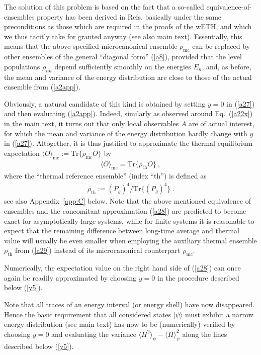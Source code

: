 \documentclass[twocolumn,aps,prb,floatfix,superscriptaddress]{revtex4-2}
\newcommand{\<}{\left\langle}	%
\renewcommand{\>}{\right\rangle}	%
\newcommand{\Pg}{P_{\! g}}
\newcommand{\tr}{\mbox{Tr}}
\newcommand{\Omc}{\langle O\rangle_{\!\mathrm{mc}}}
\newcommand{\rhomic}{\rho_{\mathrm{mc}}}
\newcommand{\rhoth}{\rho_{\mathrm{th}}}
\newcommand{\mref}[1]{\ref{#1}}
\begin{document}
The solution of this problem is based on the 
fact that a so-called equivalence-of-ensembles
property has been derived in Refs. \cite{kuw20a,tas18,bra15}
basically under the same preconditions as those
which are required in the proofs of the wETH,
and which we
thus tacitly take for granted anyway
(see also main text).
Essentially, this means that the above specified
microcanonical ensemble $\rhomic$ can be
replaced by other ensembles of the general ``diagonal form''
(\ref{a8}), provided that the level populations $\rho_{nn}$
depend sufficiently smoothly on the energies $E_n$,
and, as before, the mean and variance of the energy
distribution are close to those of the actual 
ensemble from (\ref{a2app}).

Obviously, a natural candidate of this kind is obtained
by setting $y=0$ in (\ref{a27}) and then 
evaluating (\ref{a2app}).
Indeed, similarly as
observed around Eq.~(\mref{a22x}) in the main text,
it turns out
that only local observables $A$ are of actual interest,
for which the mean and variance of the 
energy distribution hardly change with 
$y$ in (\ref{a27}).
Altogether, it is thus justified to approximate the thermal 
equilibrium expectation $\Omc:=\tr\{\rhomic O\}$ by
\begin{eqnarray}
\Omc= \tr\{\rhoth O\}
\ ,
\label{a28}
\end{eqnarray}
where the  ``thermal reference ensemble'' (index ``th'') 
is defined as
\begin{eqnarray}
\rhoth:=(\Pg )^4/\tr\{(\Pg )^4\}
\ .
\label{a29}
\end{eqnarray}
see also Appendix~\ref{app:C} below.
Note that the above mentioned equivalence
of ensembles and the concomitant approximation 
(\ref{a28}) are predicted to become exact for 
asymptotically large systems, 
while for finite systems it is reasonable to expect 
that the remaining difference between long-time 
average and thermal value will usually be 
even smaller when employing the auxiliary thermal 
ensemble $\rhoth$ from (\ref{a29}) instead of its 
microcanonical counterpart $\rhomic$.

Numerically, the expectation value on the right
hand side of (\ref{a28}) can once again be readily approximated
by choosing $y=0$ in the procedure described below (\ref{y5}).

Note that all traces of an energy interval (or energy shell)
have now disappeared. Hence the basic requirement that
all considered states $|\psi\rangle$ must exhibit a narrow
energy distribution (see main text) has now to 
be (numerically) verified 
by choosing $y=0$ and evaluating the variance
$\langle H^2\rangle_{\psi} - \langle H\rangle_{\psi}^2$
along the lines described below (\ref{y5}).
\end{document}
